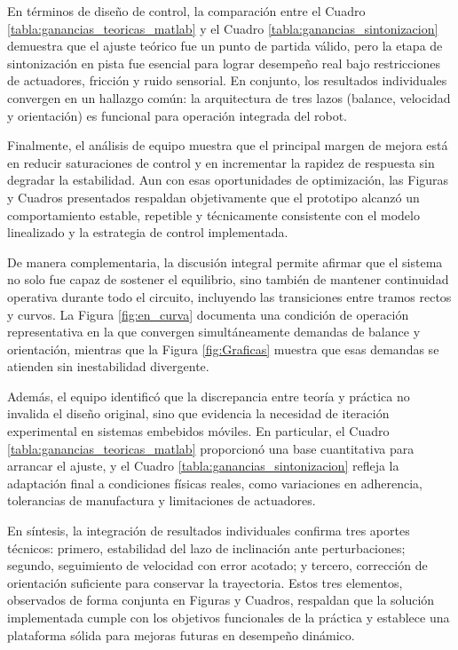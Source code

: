 \documentclass{article}
\begin{document}
En términos de diseño de control, la comparación entre el Cuadro \ref{tabla:ganancias_teoricas_matlab} y el Cuadro \ref{tabla:ganancias_sintonizacion} demuestra que el ajuste teórico fue un punto de partida válido, pero la etapa de sintonización en pista fue esencial para lograr desempeño real bajo restricciones de actuadores, fricción y ruido sensorial. En conjunto, los resultados individuales convergen en un hallazgo común: la arquitectura de tres lazos (balance, velocidad y orientación) es funcional para operación integrada del robot.

Finalmente, el análisis de equipo muestra que el principal margen de mejora está en reducir saturaciones de control y en incrementar la rapidez de respuesta sin degradar la estabilidad. Aun con esas oportunidades de optimización, las Figuras y Cuadros presentados respaldan objetivamente que el prototipo alcanzó un comportamiento estable, repetible y técnicamente consistente con el modelo linealizado y la estrategia de control implementada.

De manera complementaria, la discusión integral permite afirmar que el sistema no solo fue capaz de sostener el equilibrio, sino también de mantener continuidad operativa durante todo el circuito, incluyendo las transiciones entre tramos rectos y curvos. La Figura \ref{fig:en_curva} documenta una condición de operación representativa en la que convergen simultáneamente demandas de balance y orientación, mientras que la Figura \ref{fig:Graficas} muestra que esas demandas se atienden sin inestabilidad divergente.

Además, el equipo identificó que la discrepancia entre teoría y práctica no invalida el diseño original, sino que evidencia la necesidad de iteración experimental en sistemas embebidos móviles. En particular, el Cuadro \ref{tabla:ganancias_teoricas_matlab} proporcionó una base cuantitativa para arrancar el ajuste, y el Cuadro \ref{tabla:ganancias_sintonizacion} refleja la adaptación final a condiciones físicas reales, como variaciones en adherencia, tolerancias de manufactura y limitaciones de actuadores.

En síntesis, la integración de resultados individuales confirma tres aportes técnicos: primero, estabilidad del lazo de inclinación ante perturbaciones; segundo, seguimiento de velocidad con error acotado; y tercero, corrección de orientación suficiente para conservar la trayectoria. Estos tres elementos, observados de forma conjunta en Figuras y Cuadros, respaldan que la solución implementada cumple con los objetivos funcionales de la práctica y establece una plataforma sólida para mejoras futuras en desempeño dinámico.
\end{document}
